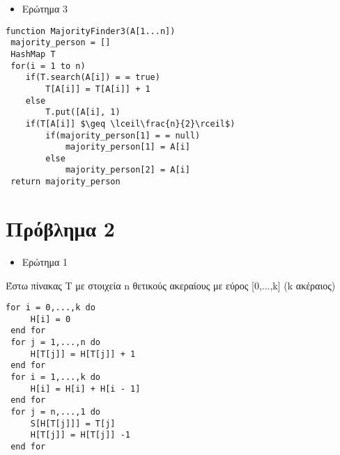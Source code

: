 \documentclass[a4paper, fleqn]{article}
\begin{document}
\begin{itemize}
\item Ερώτημα 3
\end{itemize}

\begin{lstlisting}[mathescape]
function MajorityFinder3(A[1...n])
 majority_person = []
 HashMap T
 for(i = 1 to n)
 	if(T.search(A[i]) = = true)
 		T[A[i]] = T[A[i]] + 1
 	else 
 		T.put([A[i], 1)
 	if(T[A[i]] $\geq \lceil\frac{n}{2}\rceil$)
 		if(majority_person[1] = = null)
 			majority_person[1] = A[i]
 		else
 			majority_person[2] = A[i]
 return majority_person
\end{lstlisting}

\section*{Πρόβλημα 2}

\begin{itemize}
\item Ερώτημα 1
\end{itemize}

\lstset{frame=none}
\begin{tcolorbox}[colback=blue!20!white,colframe=purple!60!white,title=\textbf{Algorithm 1}]
Έστω πίνακας T με στοιχεία n θετικούς ακεραίους με εύρος [0,...,k] (k ακέραιος)
\begin{lstlisting}[mathescape]
 for i = 0,...,k do
	 H[i] = 0
 end for
 for j = 1,...,n do
	 H[T[j]] = H[T[j]] + 1
 end for
 for i = 1,...,k do
	 H[i] = H[i] + H[i - 1]
 end for
 for j = n,...,1 do
	 S[H[T[j]]] = T[j]
	 H[T[j]] = H[T[j]] -1
 end for
\end{lstlisting}
\end{tcolorbox}
\end{document}
